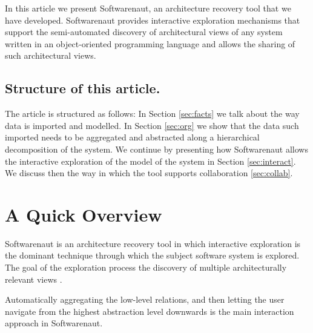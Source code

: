 \documentclass[preprint,12pt]{elsarticle}
\begin{document}
In this article we present Softwarenaut, an architecture recovery tool that we have developed. Softwarenaut provides interactive exploration mechanisms that support the semi-automated discovery of architectural views of any system written in an object-oriented programming language and allows the sharing of such architectural views. 

\subsection*{Structure of this article.} The article is structured as follows: In Section \ref{sec:facts} we talk about the way data is imported and modelled. In Section \ref{sec:org} we show that the data such imported needs to be aggregated and abstracted along a hierarchical decomposition of the system. We continue by presenting how Softwarenaut allows the interactive exploration of the model of the system in Section \ref{sec:interact}. We discuss then the way in which the tool supports collaboration \ref{sec:collab}. %



\section {A Quick Overview}
\label{sec:over}

Softwarenaut is an architecture recovery tool in which interactive exploration is the dominant technique through which the subject software system is explored. The goal of the exploration process the discovery of multiple architecturally relevant views \cite{lungu-packages}.

Automatically aggregating the low-level relations, and then letting the user navigate from the highest abstraction level downwards is the main interaction approach in Softwarenaut. 
\end{document}
